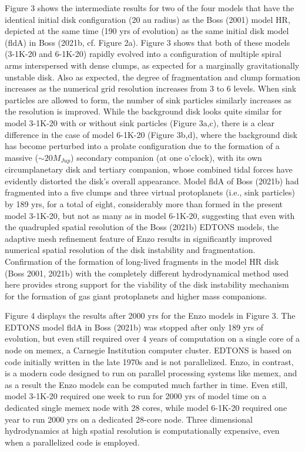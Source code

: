 \documentclass[12pt,preprint]{aastex}
\begin{document}
 Figure 3 shows the intermediate results for two of the four models that have
the identical initial disk configuration (20 au radius) as the Boss (2001) model HR,
depicted at the same time (190 yrs of evolution) as the same initial disk
model (fldA) in Boss (2021b, cf. Figure 2a). Figure 3 shows that both of these
models (3-1K-20 and 6-1K-20) rapidly evolved into a configuration of multiple 
spiral arms interspersed with dense clumps, as expected for a marginally 
gravitationally unstable disk. Also as expected, the degree of fragmentation
and clump formation increases as the numerical grid resolution increases from
3 to 6 levels. When sink particles are allowed to form, the number of sink particles
similarly increases as the resolution is improved. While the background disk
looks quite similar for model 3-1K-20 with or without sink particles (Figure 3a,c),
there is a clear difference in the case of model 6-1K-20 (Figure 3b,d), where
the background disk has become perturbed into a prolate configuration due 
to the formation of a massive ($\sim 20 M_{Jup}$) secondary companion 
(at one o'clock), with its own circumplanetary disk and tertiary companion, 
whose combined tidal forces have evidently distorted the disk's overall appearance.
Model fldA of Boss (2021b) had fragmented into a five clumps and three virtual
protoplanets (i.e., sink particles) by 189 yrs, for a total of eight, considerably
more than formed in the present model 3-1K-20, but not as many as in
model 6-1K-20, suggesting that even with the quadrupled spatial resolution
of the Boss (2021b) EDTONS models, the adaptive mesh refinement feature of
Enzo results in significantly improved numerical spatial resolution of the 
disk instability and fragmentation. Confirmation of the formation of long-lived
fragments in the model HR disk (Boss 2001, 2021b) with the completely different 
hydrodynamical method used here provides strong support for the viability
of the disk instability mechanism for the formation of gas giant protoplanets
and higher mass companions.

 Figure 4 displays the results after 2000 yrs for the Enzo models in Figure 3. The 
EDTONS model fldA in Boss (2021b) was stopped after only 189 yrs of evolution, 
but even still required over 4 years of computation on a single core of a node on 
memex, a Carnegie Institution computer cluster. EDTONS is based on code initially
written in the late 1970s and is not parallelized. Enzo, in contrast, is a modern
code designed to run on parallel processing systems like memex, and as a
result the Enzo models can be computed much farther in time. Even still,
model 3-1K-20 required one week to run for 2000 yrs of model time on a dedicated 
single memex node with 28 cores, while model 6-1K-20 required 
one year to run 2000 yrs on a dedicated 28-core node. Three dimensional
hydrodynamics at high spatial resolution is computationally expensive,
even when a parallelized code is employed.
\end{document}
